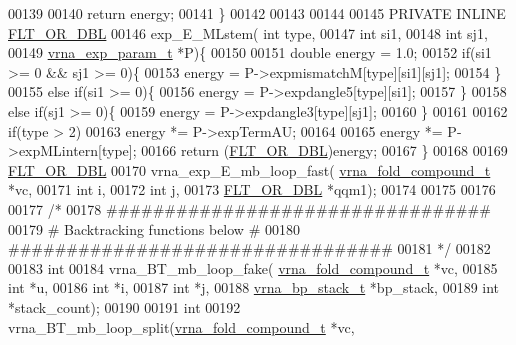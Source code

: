 \begin{DoxyCode}
00139 
00140   \textcolor{keywordflow}{return} energy;
00141 \}
00142 
00143 
00144 
00145 PRIVATE INLINE \hyperlink{group__data__structures_ga31125aeace516926bf7f251f759b6126}{FLT\_OR\_DBL}
00146 exp\_E\_MLstem( \textcolor{keywordtype}{int} type,
00147               \textcolor{keywordtype}{int} si1,
00148               \textcolor{keywordtype}{int} sj1,
00149               \hyperlink{group__energy__parameters_structvrna__exp__param__s}{vrna\_exp\_param\_t} *P)\{
00150 
00151   \textcolor{keywordtype}{double} energy = 1.0;
00152   \textcolor{keywordflow}{if}(si1 >= 0 && sj1 >= 0)\{
00153     energy = P->expmismatchM[type][si1][sj1];
00154   \}
00155   \textcolor{keywordflow}{else} \textcolor{keywordflow}{if}(si1 >= 0)\{
00156     energy = P->expdangle5[type][si1];
00157   \}
00158   \textcolor{keywordflow}{else} \textcolor{keywordflow}{if}(sj1 >= 0)\{
00159     energy = P->expdangle3[type][sj1];
00160   \}
00161 
00162   \textcolor{keywordflow}{if}(type > 2)
00163     energy *= P->expTermAU;
00164 
00165   energy *= P->expMLintern[type];
00166   \textcolor{keywordflow}{return} (\hyperlink{group__data__structures_ga31125aeace516926bf7f251f759b6126}{FLT\_OR\_DBL})energy;
00167 \}
00168 
00169 \hyperlink{group__data__structures_ga31125aeace516926bf7f251f759b6126}{FLT\_OR\_DBL}
00170 vrna\_exp\_E\_mb\_loop\_fast( \hyperlink{group__fold__compound_structvrna__fc__s}{vrna\_fold\_compound\_t} *vc,
00171                     \textcolor{keywordtype}{int} i,
00172                     \textcolor{keywordtype}{int} j,
00173                     \hyperlink{group__data__structures_ga31125aeace516926bf7f251f759b6126}{FLT\_OR\_DBL} *qqm1);
00174 
00175 
00176 
00177 \textcolor{comment}{/*}
00178 \textcolor{comment}{#################################}
00179 \textcolor{comment}{# Backtracking functions below  #}
00180 \textcolor{comment}{#################################}
00181 \textcolor{comment}{*/}
00182 
00183 \textcolor{keywordtype}{int}
00184 vrna\_BT\_mb\_loop\_fake( \hyperlink{group__fold__compound_structvrna__fc__s}{vrna\_fold\_compound\_t} *vc,
00185                       \textcolor{keywordtype}{int} *u,
00186                       \textcolor{keywordtype}{int} *i,
00187                       \textcolor{keywordtype}{int} *j,
00188                       \hyperlink{group__data__structures_structvrna__bp__stack__s}{vrna\_bp\_stack\_t} *bp\_stack,
00189                       \textcolor{keywordtype}{int} *stack\_count);
00190 
00191 \textcolor{keywordtype}{int}
00192 vrna\_BT\_mb\_loop\_split(\hyperlink{group__fold__compound_structvrna__fc__s}{vrna\_fold\_compound\_t} *vc,

\end{DoxyCode}
